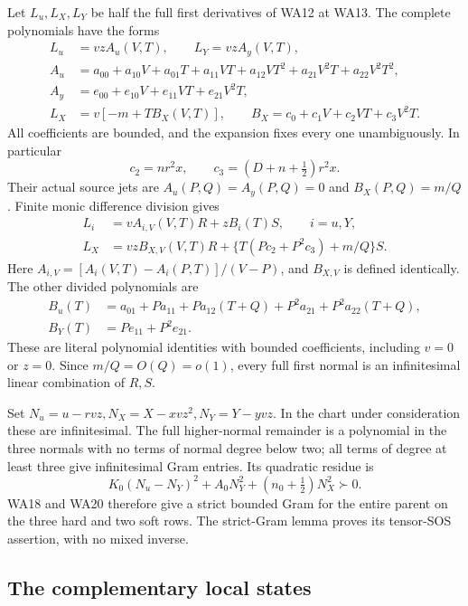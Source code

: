 Let \(L_u,L_X,L_Y\) be half the full first derivatives of WA12 at
WA13. The complete polynomials have the forms
\[
\begin{aligned}
 L_u&=vz A_u(V,T),\qquad L_Y=vz A_y(V,T),\\
 A_u&=a_{00}+a_{10}V+a_{01}T+a_{11}VT
                      +a_{12}VT^2+a_{21}V^2T+a_{22}V^2T^2,\\
 A_y&=e_{00}+e_{10}V+e_{11}VT+e_{21}V^2T,\\
 L_X&=v[-m+TB_X(V,T)],\qquad
 B_X=c_0+c_1V+c_2VT+c_3V^2T .
\end{aligned}\tag{WA19}
\]
All coefficients are bounded, and the expansion fixes every one
unambiguously. In particular
\[
 c_2=nr^2x,\qquad c_3=(D+n+\tfrac12)r^2x .
\]
Their actual source jets are \(A_u(P,Q)=A_y(P,Q)=0\) and
\(B_X(P,Q)=m/Q\). Finite monic difference division gives
\[
\begin{aligned}
 L_i&=v A_{i,V}(V,T)R+z B_i(T)S,\qquad i=u,Y,\\
 L_X&=vz B_{X,V}(V,T)R+
                \{T(Pc_2+P^2c_3)+m/Q\}S .
\end{aligned}\tag{WA20}
\]
Here \(A_{i,V}=[A_i(V,T)-A_i(P,T)]/(V-P)\), and \(B_{X,V}\)
is defined identically. The other divided polynomials are
\[
\begin{aligned}
B_u(T)&=a_{01}+Pa_{11}+Pa_{12}(T+Q)+P^2a_{21}
                                      +P^2a_{22}(T+Q),\\
B_Y(T)&=Pe_{11}+P^2e_{21}.
\end{aligned}
\]
These are literal polynomial identities with bounded coefficients,
including \(v=0\) or \(z=0\). Since \(m/Q=O(Q)=o(1)\),
every full first normal is an infinitesimal linear combination of \(R,S\).

Set \(N_u=u-rvz,N_X=X-xvz^2,N_Y=Y-yvz\). In the chart under
consideration these are infinitesimal. The full higher-normal
remainder is a polynomial in the three normals with no terms of
normal degree below two; all terms of degree at least three give
infinitesimal Gram entries. Its quadratic residue is
\[
 K_0(N_u-N_Y)^2+A_0N_Y^2+(n_0+\tfrac12)N_X^2\succ0.
 \tag{WA21}
\]
WA18 and WA20 therefore give a strict bounded Gram for the entire
parent on the three hard and two soft rows. The strict-Gram lemma
proves its tensor-SOS assertion, with no mixed inverse.

\subsection{The complementary local states}

